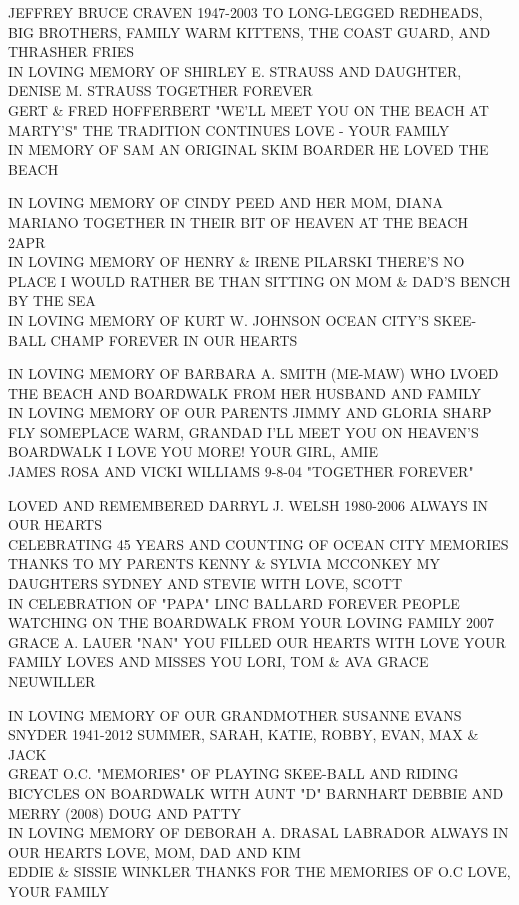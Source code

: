 \documentclass[10pt,letterpaper]{article}
\begin{document}
JEFFREY BRUCE CRAVEN 1947{-}2003 TO LONG{-}LEGGED REDHEADS, BIG BROTHERS, FAMILY WARM KITTENS, THE COAST GUARD, AND THRASHER FRIES\\
IN LOVING MEMORY OF SHIRLEY E. STRAUSS AND DAUGHTER, DENISE M. STRAUSS TOGETHER FOREVER\\
GERT \& FRED HOFFERBERT "WE'LL MEET YOU ON THE BEACH AT MARTY'S" THE TRADITION CONTINUES LOVE {-} YOUR FAMILY\\
IN MEMORY OF SAM AN ORIGINAL SKIM BOARDER HE LOVED THE BEACH

IN LOVING MEMORY OF CINDY PEED AND HER MOM, DIANA MARIANO TOGETHER IN THEIR BIT OF HEAVEN AT THE BEACH\\
2APR\\
IN LOVING MEMORY OF HENRY \& IRENE PILARSKI THERE'S NO PLACE I WOULD RATHER BE THAN SITTING ON MOM \& DAD'S BENCH BY THE SEA\\
IN LOVING MEMORY OF KURT W. JOHNSON OCEAN CITY'S SKEE{-}BALL CHAMP FOREVER IN OUR HEARTS

IN LOVING MEMORY OF BARBARA A. SMITH (ME{-}MAW) WHO LVOED THE BEACH AND BOARDWALK FROM HER HUSBAND AND FAMILY\\
IN LOVING MEMORY OF OUR PARENTS JIMMY AND GLORIA SHARP\\
FLY SOMEPLACE WARM, GRANDAD I'LL MEET YOU ON HEAVEN'S BOARDWALK I LOVE YOU MORE!  YOUR GIRL, AMIE\\
JAMES ROSA AND VICKI WILLIAMS 9{-}8{-}04 "TOGETHER FOREVER"

LOVED AND REMEMBERED DARRYL J. WELSH 1980{-}2006 ALWAYS IN OUR HEARTS\\
CELEBRATING 45 YEARS AND COUNTING OF OCEAN CITY MEMORIES THANKS TO MY PARENTS KENNY \& SYLVIA MCCONKEY MY DAUGHTERS SYDNEY AND STEVIE WITH LOVE, SCOTT\\
IN CELEBRATION OF "PAPA" LINC BALLARD FOREVER PEOPLE WATCHING ON THE BOARDWALK FROM YOUR LOVING FAMILY 2007\\
GRACE A. LAUER "NAN" YOU FILLED OUR HEARTS WITH LOVE YOUR FAMILY LOVES AND MISSES YOU LORI, TOM \& AVA GRACE NEUWILLER

IN LOVING MEMORY OF OUR GRANDMOTHER SUSANNE EVANS SNYDER 1941{-}2012 SUMMER, SARAH, KATIE, ROBBY, EVAN, MAX \& JACK\\
GREAT O.C. "MEMORIES" OF PLAYING SKEE{-}BALL AND RIDING BICYCLES ON BOARDWALK WITH AUNT "D" BARNHART DEBBIE AND MERRY (2008) DOUG AND PATTY\\
IN LOVING MEMORY OF DEBORAH A. DRASAL LABRADOR ALWAYS IN OUR HEARTS LOVE, MOM, DAD AND KIM\\
EDDIE \& SISSIE WINKLER THANKS FOR THE MEMORIES OF O.C LOVE, YOUR FAMILY
\end{document}
